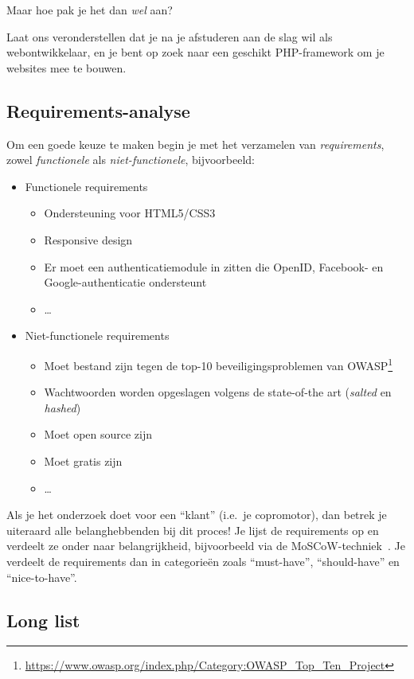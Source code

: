 Maar hoe pak je het dan \emph{wel} aan?

Laat ons veronderstellen dat je na je afstuderen aan de slag wil als webontwikkelaar, en je bent op zoek naar een geschikt PHP-framework om je websites mee te bouwen.

\subsection{Requirements-analyse}%
\label{ssec:requirements-analyse}

Om een goede keuze te maken begin je met het verzamelen van \emph{requirements}, zowel \textit{functionele} als \emph{niet-functionele}, bijvoorbeeld:

\begin{itemize}
\item Functionele requirements
  \begin{itemize}
  \item Ondersteuning voor HTML5/CSS3
  \item Responsive design
  \item Er moet een authenticatiemodule in zitten die OpenID, Facebook- en Goo\-gle-authenticatie ondersteunt
  \item \ldots
  \end{itemize}
\item Niet-functionele requirements
  \begin{itemize}
  \item Moet bestand zijn tegen de top-10 beveiligingsproblemen van OWASP\footnote{\url{https://www.owasp.org/index.php/Category:OWASP_Top_Ten_Project}}
  \item Wachtwoorden worden opgeslagen volgens de state-of-the art (\emph{salted} en \emph{hashed})
  \item Moet open source zijn
  \item Moet gratis zijn
  \item \ldots
  \end{itemize}
\end{itemize}

Als je het onderzoek doet voor een ``klant'' (i.e.\ je copromotor), dan betrek je uiteraard alle belanghebbenden bij dit proces! Je lijst de requirements op en verdeelt ze onder naar belangrijkheid, bijvoorbeeld via de MoSCoW-techniek~\parencite{Nordenstam2014}. Je verdeelt de requirements dan in categorieën zoals ``must-have'', ``should-have'' en ``nice-to-have''.

\subsection{Long list}%
\label{ssec:long-list}

